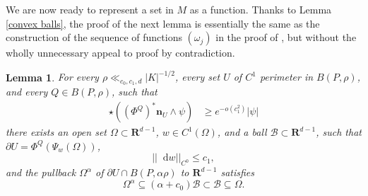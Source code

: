\documentclass[reqno,11pt]{amsart}
\newcommand{\RR}{\mathbf{R}}
\newcommand*\dif{\mathop{}\!\mathrm{d}}
\newcommand{\normal}{\mathbf n}
\newtheorem{lemma}[theorem]{Lemma}
\theoremstyle{definition}
\numberwithin{equation}{section}
\begin{document}
We are now ready to represent a set in $M$ as a function.
Thanks to Lemma \ref{convex balls}, the proof of the next lemma is essentially the same as the construction of the sequence of functions $(\omega_j)$ in the proof of \cite[Lemma 6.4]{Giusti77}, but without the wholly unnecessary appeal to proof by contradiction.

\begin{lemma}\label{rep as a good graph}
For every $\rho \ll_{c_0, c_1, d} |K|^{-1/2}$, every set $U$ of $C^1$ perimeter in $B(P, \rho)$, and every $Q \in B(P, \rho)$, such that
\begin{align}
\star((\Phi^Q)^* \normal_U \wedge \psi) &\geq e^{-o(c_1^2)} |\psi| \label{rep as a good graph hyp}
\end{align}
there exists an open set $\Omega \subset \RR^{d - 1}$, $w \in C^1(\Omega)$, and a ball $\mathscr B \subset \RR^{d - 1}$, such that $\partial U = \Phi^Q(\Psi_w(\Omega))$,
\begin{equation}\label{rep as a good graph small derivative}
||\dif w||_{C^0} \leq c_1,
\end{equation}
and the pullback $\Omega^\alpha$ of $\partial U \cap B(P, \alpha \rho)$ to $\RR^{d - 1}$ satisfies
\begin{equation}\label{rep as a good graph set nests}
    \Omega^\alpha \subseteq (\alpha + c_0) \mathscr B \subset \mathscr B \subseteq \Omega.
\end{equation}
\end{lemma}
\end{document}

